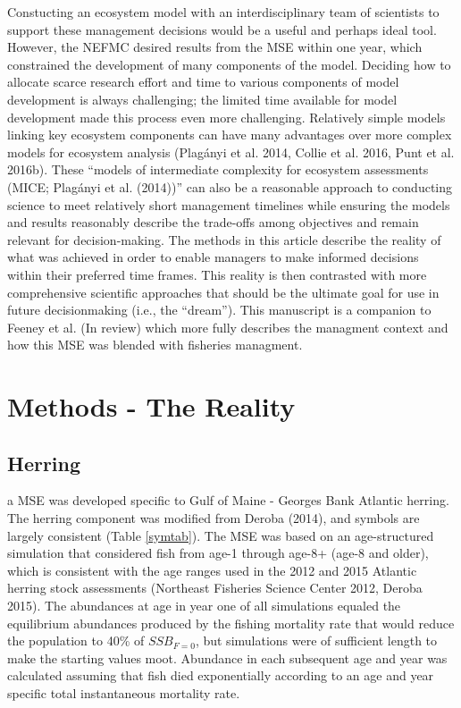 \documentclass[]{article}
\begin{document}
Constucting an ecosystem model with an interdisciplinary team of
scientists to support these management decisions would be a useful and
perhaps ideal tool. However, the NEFMC desired results from the MSE
within one year, which constrained the development of many components of
the model. Deciding how to allocate scarce research effort and time to
various components of model development is always challenging; the
limited time available for model development made this process even more
challenging. Relatively simple models linking key ecosystem components
can have many advantages over more complex models for ecosystem analysis
(Plagányi et al. 2014, Collie et al. 2016, Punt et al. 2016b). These
``models of intermediate complexity for ecosystem assessments (MICE;
Plagányi et al. (2014))'' can also be a reasonable approach to
conducting science to meet relatively short management timelines while
ensuring the models and results reasonably describe the trade-offs among
objectives and remain relevant for decision-making. The methods in this
article describe the reality of what was achieved in order to enable
managers to make informed decisions within their preferred time frames.
This reality is then contrasted with more comprehensive scientific
approaches that should be the ultimate goal for use in future
decisionmaking (i.e., the ``dream''). This manuscript is a companion to
Feeney et al. (In review) which more fully describes the managment
context and how this MSE was blended with fisheries managment.

\section{Methods - The Reality}\label{methods---the-reality}

\subsection{Herring}\label{herring}

a MSE was developed specific to Gulf of Maine - Georges Bank Atlantic
herring. The herring component was modified from Deroba (2014), and
symbols are largely consistent (Table \ref{symtab}). The MSE was based
on an age-structured simulation that considered fish from age-1 through
age-8+ (age-8 and older), which is consistent with the age ranges used
in the 2012 and 2015 Atlantic herring stock assessments (Northeast
Fisheries Science Center 2012, Deroba 2015). The abundances at age in
year one of all simulations equaled the equilibrium abundances produced
by the fishing mortality rate that would reduce the population to 40\%
of \(SSB_{F=0}\), but simulations were of sufficient length to make the
starting values moot. Abundance in each subsequent age and year was
calculated assuming that fish died exponentially according to an age and
year specific total instantaneous mortality rate.
\end{document}
